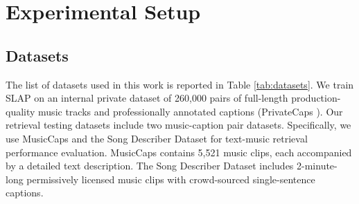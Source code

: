 \documentclass{article}
\begin{document}



\section{Experimental Setup}
\subsection{Datasets} \label{subsection: Datasets}

The list of datasets used in this work is reported in Table \ref{tab:datasets}.
We train SLAP on an internal private dataset of 260,000 pairs of full-length production-quality music tracks and professionally annotated captions (PrivateCaps \cite{manco2022contrastive}). Our retrieval testing datasets include two music-caption pair datasets. Specifically, we use MusicCaps \cite{agostinelli2023musiclm} and the Song Describer Dataset \cite{manco2023song} for text-music retrieval performance evaluation. MusicCaps contains 5,521 music clips, each accompanied by a detailed text description. The Song Describer Dataset includes 2-minute-long permissively licensed music clips with crowd-sourced single-sentence captions.
\end{document}

